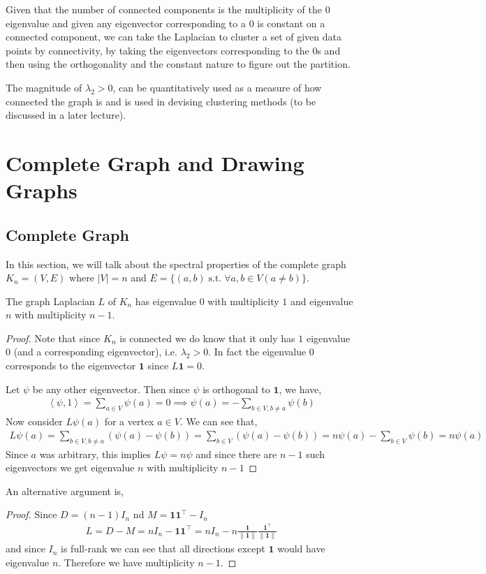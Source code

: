\documentclass[11pt,letterpaper]{article}
\newcommand{\vOne}{\mathbf{1}}
\newcommand{\dpro}[1]{\left \langle #1 \right \rangle}
\begin{document}
Given that the number of connected components is the multiplicity of the $0$ eigenvalue and given any eigenvector corresponding to a $0$ is constant on a connected component, we can take the Laplacian to cluster a set of given data points by connectivity, by taking the eigenvectors corresponding to the $0$s and then using the orthogonality and the constant nature to figure out the partition.

The magnitude of $\lambda_2 >0$, can be quantitatively used as a measure of how connected the graph is and is used in devising clustering methods (to be discussed in a later lecture).

\section{Complete Graph and Drawing Graphs}

\subsection{Complete Graph}

In this section, we will talk about the spectral properties of the complete graph $K_n = (V,E)$ where $|V| = n$ and $E = \{(a,b) \;\text{s.t.}\; \forall a,b \in V (a \neq b)\}$.

\begin{theorem}
The graph Laplacian $L$ of $K_n$ has eigenvalue $0$ with multiplicity $1$ and eigenvalue $n$ with multiplicity $n-1$.
\end{theorem}
\begin{proof}
Note that since $K_n$ is connected we do know that it only has $1$ eigenvalue $0$ (and a corresponding eigenvector), i.e. $\lambda_2>0$. In fact the eigenvalue $0$ corresponds to the eigenvector $\vOne$ since $L\vOne = 0$. 

Let $\psi$ be any other eigenvector. Then since $\psi$ is orthogonal to $\vOne$, we have,
\begin{align*}
\dpro{\psi,1} = \sum_{a \in V} \psi(a) = 0 \implies \psi(a) = -\sum_{b \in V, b\neq a} \psi(b)
\end{align*}
Now consider $L\psi(a)$ for a vertex $a \in V$. We can see that,
\begin{align*}
L\psi(a) = \sum_{b \in V, b\neq a} \left(\psi(a)-\psi(b)\right) = \sum_{b \in V} \left(\psi(a)-\psi(b)\right) = n\psi(a)-\sum_{b \in V} \psi(b) = n\psi(a)
\end{align*}
Since $a$ was arbitrary, this implies $L\psi = n\psi$ and since there are $n-1$ such eigenvectors we get eigenvalue $n$ with multiplicity $n-1$
\end{proof}
An alternative argument is,
\begin{proof}
Since $D=(n-1)I_n$ nd $M = \vOne\vOne^\top - I_n$
\begin{align*}
L = D-M = nI_n-\vOne\vOne^\top = nI_n-n\frac{\vOne}{\|\vOne\|}\frac{\vOne^\top}{\|\vOne\|}
\end{align*}
and since $I_n$ is full-rank we can see that all directions except $\vOne$ would have eigenvalue $n$. Therefore we have multiplicity $n-1$.
\end{proof}
\end{document}

